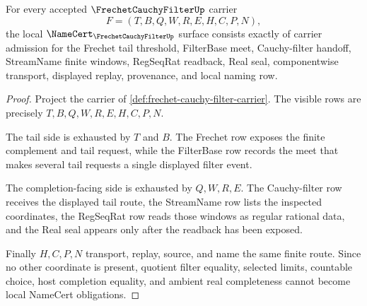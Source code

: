 \begin{theorem}
\label{thm:frechet-cauchy-filter-namecert-obligations}
For every accepted $\FrechetCauchyFilterUp$ carrier
$$
F=(T,B,Q,W,R,E,H,C,P,N),
$$
the local $\NameCert_{\FrechetCauchyFilterUp}$ surface consists exactly of carrier admission for the Frechet tail threshold, FilterBase meet, Cauchy-filter handoff, StreamName finite windows, RegSeqRat readback, Real seal, componentwise transport, displayed replay, provenance, and local naming row.
\end{theorem}
\begin{proof}
Project the carrier of \autoref{def:frechet-cauchy-filter-carrier}. The visible rows are precisely $T,B,Q,W,R,E,H,C,P,N$.

The tail side is exhausted by $T$ and $B$. The Frechet row exposes the finite complement and tail request, while the FilterBase row records the meet that makes several tail requests a single displayed filter event.

The completion-facing side is exhausted by $Q,W,R,E$. The Cauchy-filter row receives the displayed tail route, the StreamName row lists the inspected coordinates, the RegSeqRat row reads those windows as regular rational data, and the Real seal appears only after the readback has been exposed.

Finally $H,C,P,N$ transport, replay, source, and name the same finite route. Since no other coordinate is present, quotient filter equality, selected limits, countable choice, host completion equality, and ambient real completeness cannot become local NameCert obligations.
\end{proof}

